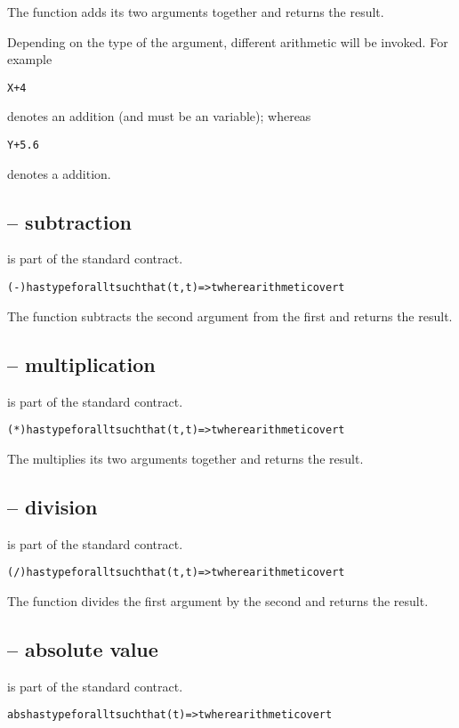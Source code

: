 The \q{+} function adds its two arguments together and returns the result.

Depending on the type of the argument, different arithmetic will be invoked. For example
\begin{alltt}
X+4
\end{alltt}
denotes an  addition (and  must be an  variable); whereas
\begin{alltt}
Y+5.6
\end{alltt}
denotes a  addition.

\subsection{\q{-} -- subtraction}
\label{minusFunction}
\q{-} is part of the standard  contract.
\begin{alltt}
(-) has type for all t such that (t,t)=>t where arithmetic over t
\end{alltt}

The \q{-} function subtracts the second argument from the first and returns the result.

\subsection{\q{*} -- multiplication}
\label{timesFunction}
\q{*} is part of the standard  contract.
\begin{alltt}
(*) has type for all t such that (t,t)=>t where arithmetic over t
\end{alltt}
The \q{*} multiplies its two arguments together and returns the result.

\subsection{\q{/} -- division}
\label{divideFunction}
\q{/} is part of the standard  contract.
\begin{alltt}
(/) has type for all t such that (t,t)=>t where arithmetic over t
\end{alltt}
The \q{/} function divides the first argument by the second and returns the result.


\subsection{ -- absolute value}
\label{abdFunction}
 is part of the standard  contract.
\begin{alltt}
abs has type for all t such that (t)=>t where arithmetic over t
\end{alltt}


